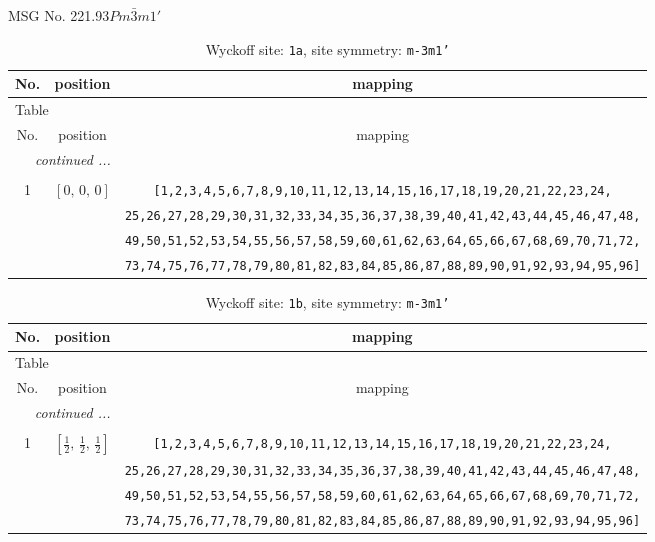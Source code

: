 \documentclass[fleqn,8pt]{jsarticle}
\begin{document}
\setcounter{MaxMatrixCols}{32}

\renewcommand{\tablename}{Table~}
\renewcommand{\figurename}{Figure~}
\begin{center}
\LARGE
MSG No. 221.93\quad$Pm\bar{3}m1'$
\end{center}
\renewcommand{\arraystretch}{1.2}
\begin{longtable}{ccc}
\caption{Wyckoff site: {\tt 1a}, site symmetry: {\tt m-3m1'}}
 \\
 \hline \hline
No. & position & mapping \\ \hline \endfirsthead

\multicolumn{2}{l}{\tablename\ \thetable{}} \\
 \hline \hline
No. & position & mapping \\ \hline \endhead

 \hline \hline
\multicolumn{2}{r}{\footnotesize\it continued ...} \\ \endfoot

 \hline \hline
\multicolumn{2}{r}{} \\ \endlastfoot

1 & $\left[ 0,\, 0,\, 0 \right]$ & {\tt [1,2,3,4,5,6,7,8,9,10,11,12,13,14,15,16,17,18,19,20,21,22,23,24,} \\ \hline
 &  & {\tt 25,26,27,28,29,30,31,32,33,34,35,36,37,38,39,40,41,42,43,44,45,46,47,48,} \\ \hline
 &  & {\tt 49,50,51,52,53,54,55,56,57,58,59,60,61,62,63,64,65,66,67,68,69,70,71,72,} \\ \hline
 &  & {\tt 73,74,75,76,77,78,79,80,81,82,83,84,85,86,87,88,89,90,91,92,93,94,95,96]} \\
\end{longtable}
\renewcommand{\arraystretch}{1.2}
\begin{longtable}{ccc}
\caption{Wyckoff site: {\tt 1b}, site symmetry: {\tt m-3m1'}}
 \\
 \hline \hline
No. & position & mapping \\ \hline \endfirsthead

\multicolumn{2}{l}{\tablename\ \thetable{}} \\
 \hline \hline
No. & position & mapping \\ \hline \endhead

 \hline \hline
\multicolumn{2}{r}{\footnotesize\it continued ...} \\ \endfoot

 \hline \hline
\multicolumn{2}{r}{} \\ \endlastfoot

1 & $\left[ \frac{1}{2},\, \frac{1}{2},\, \frac{1}{2} \right]$ & {\tt [1,2,3,4,5,6,7,8,9,10,11,12,13,14,15,16,17,18,19,20,21,22,23,24,} \\ \hline
 &  & {\tt 25,26,27,28,29,30,31,32,33,34,35,36,37,38,39,40,41,42,43,44,45,46,47,48,} \\ \hline
 &  & {\tt 49,50,51,52,53,54,55,56,57,58,59,60,61,62,63,64,65,66,67,68,69,70,71,72,} \\ \hline
 &  & {\tt 73,74,75,76,77,78,79,80,81,82,83,84,85,86,87,88,89,90,91,92,93,94,95,96]} \\
\end{longtable}
\end{document}
